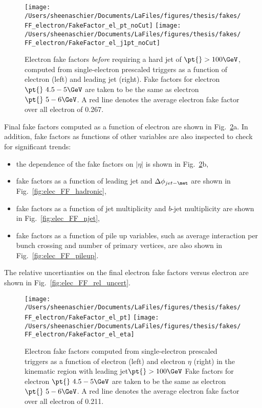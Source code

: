 \begin{figure}[tbp]
  \centering
  \texttt{[image: /Users/sheenaschier/Documents/LaFiles/figures/thesis/fakes/FF\_electron/FakeFactor\_el\_pt\_noCut]}
  \texttt{[image: /Users/sheenaschier/Documents/LaFiles/figures/thesis/fakes/FF\_electron/FakeFactor\_el\_j1pt\_noCut]}\\
  \caption{Electron fake factors \textit{before} requiring a hard jet of $\pt{} > 100\GeV$, computed from single-electron prescaled triggers as a function of electron \pt{} (left) and leading jet \pt{} (right). Fake factors for electron $\pt{}~ 4.5-5\GeV$ are taken to be the same as electron $\pt{}~5-6\GeV$.  A red line denotes the average electron fake factor over all electron \pt{} of 0.267. }
  \label{fig:elec_FF_hist_noCut}
\end{figure}


Final fake factors computed as a function of electron \pt{} are shown in Fig.~\ref{fig:elec_FF_hist}a.  In addition, fake factors as functions of other variables are also inspected to check for significant trends:
\begin{itemize}
\item the dependence of the fake factors on $|\eta|$ is shown in Fig.~\ref{fig:elec_FF_hist}b,
\item fake factors as a function of leading jet \pt{} and  $\Delta\phi_{jet-\met}$ are shown in Fig.~\ref{fig:elec_FF_hadronic},
\item fake factors as a function of jet multiplicity and $b$-jet multiplicity are shown in Fig.~\ref{fig:elec_FF_njet},
\item fake factors as a function of pile up variables, such as average interaction per bunch crossing and number of primary vertices, are also shown in Fig.~\ref{fig:elec_FF_pileup}.
\end{itemize}
The relative uncertianties on the final electron fake factors versus electron \pt{} are shown in Fig.~\ref{fig:elec_FF_rel_uncert}.

\begin{figure}[tbp]
  \centering
  \texttt{[image: /Users/sheenaschier/Documents/LaFiles/figures/thesis/fakes/FF\_electron/FakeFactor\_el\_pt]}
  \texttt{[image: /Users/sheenaschier/Documents/LaFiles/figures/thesis/fakes/FF\_electron/FakeFactor\_el\_eta]}
  \caption{Electron fake factors computed from single-electron prescaled triggers as a function of electron \pt{} (left) and electron $\eta$ (right) in the kinematic region with leading jet$ \pt{}>100\GeV$  Fake factors for electron $\pt{}~ 4.5-5\GeV$ are taken to be the same as electron $\pt{}~5-6\GeV$.  A red line denotes the average electron fake factor over all electron \pt{} of 0.211. }
  \label{fig:elec_FF_hist}
\end{figure}

